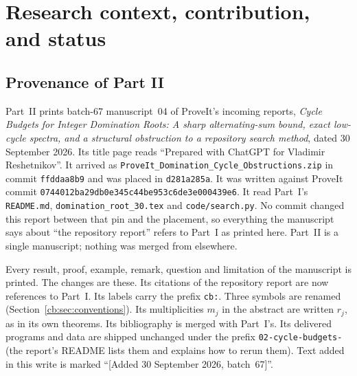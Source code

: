 \documentclass[11pt]{article}
\numberwithin{equation}{section}
\theoremstyle{definition}
\begin{document}
\section{Research context, contribution, and status}\label{cb:sec:context}

\subsection{Provenance of Part II}\label{cb:sec:provenance}
Part~II prints batch-67 manuscript~04 of ProveIt's incoming reports,
\emph{Cycle Budgets for Integer Domination Roots: A sharp alternating-sum
bound, exact low-cycle spectra, and a structural obstruction to a
repository search method}, dated 30 September 2026. Its title page reads
``Prepared with ChatGPT for Vladimir Reshetnikov''. It arrived as
\texttt{ProveIt\_Domination\_Cycle\_Obstructions.zip} in commit
\texttt{ffddaa8b9} and was placed in \texttt{d281a285a}. It was written
against ProveIt commit
\nolinkurl{0744012ba29db0e345c44be953c6de3e000439e6}. It read Part~I's
\texttt{README.md}, \texttt{domination\_root\_30.tex} and
\texttt{code/search.py}. No commit changed this report between that pin and
the placement, so everything the manuscript says about ``the repository
report'' refers to Part~I as printed here. Part~II is a single manuscript;
nothing was merged from elsewhere.

Every result, proof, example, remark, question and limitation of the
manuscript is printed. The changes are these. Its citations of the
repository report are now references to Part~I. Its labels carry the
prefix \texttt{cb:}. Three symbols are renamed (Section~\ref{cb:sec:conventions}).
Its multiplicities \(m_j\) in the abstract are written \(r_j\), as in its
own theorems. Its bibliography is merged with Part~I's. Its delivered
programs and data are shipped unchanged under the prefix
\texttt{02-cycle-budgets-} (the report's README lists them and explains
how to rerun them). Text added in this write is marked
``[Added 30 September 2026, batch~67]''.
\end{document}
